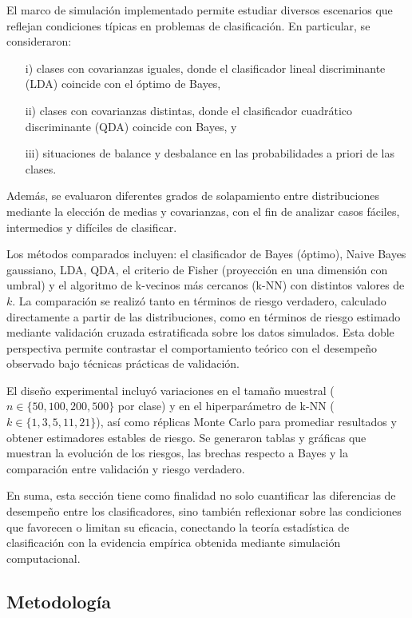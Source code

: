 \documentclass[10pt]{article}
\begin{document}
El marco de simulación implementado permite estudiar diversos escenarios que reflejan condiciones típicas en problemas de clasificación. En particular, se consideraron: 
\begin{itemize}
\item[i)] clases con covarianzas iguales, donde el clasificador lineal discriminante (LDA) coincide con el óptimo de Bayes, 

\item[ii)] clases con covarianzas distintas, donde el clasificador cuadrático discriminante (QDA) coincide con Bayes, y 

\item[iii)] situaciones de balance y desbalance en las probabilidades a priori de las clases. 
\end{itemize}
Además, se evaluaron diferentes grados de solapamiento entre distribuciones mediante la elección de medias y covarianzas, con el fin de analizar casos fáciles, intermedios y difíciles de clasificar.

Los métodos comparados incluyen: el clasificador de Bayes (óptimo), Naive Bayes gaussiano, LDA, QDA, el criterio de Fisher (proyección en una dimensión con umbral) y el algoritmo de k-vecinos más cercanos (k-NN) con distintos valores de $k$. La comparación se realizó tanto en términos de riesgo verdadero, calculado directamente a partir de las distribuciones, como en términos de riesgo estimado mediante validación cruzada estratificada sobre los datos simulados. Esta doble perspectiva permite contrastar el comportamiento teórico con el desempeño observado bajo técnicas prácticas de validación.

El diseño experimental incluyó variaciones en el tamaño muestral ($n \in \{50, 100, 200, 500\}$ por clase) y en el hiperparámetro de k-NN ($k \in \{1, 3, 5, 11, 21\}$), así como réplicas Monte Carlo para promediar resultados y obtener estimadores estables de riesgo. Se generaron tablas y gráficas que muestran la evolución de los riesgos, las brechas respecto a Bayes y la comparación entre validación y riesgo verdadero. 

En suma, esta sección tiene como finalidad no solo cuantificar las diferencias de desempeño entre los clasificadores, sino también reflexionar sobre las condiciones que favorecen o limitan su eficacia, conectando la teoría estadística de clasificación con la evidencia empírica obtenida mediante simulación computacional.

\subsection*{Metodología}
\end{document}

